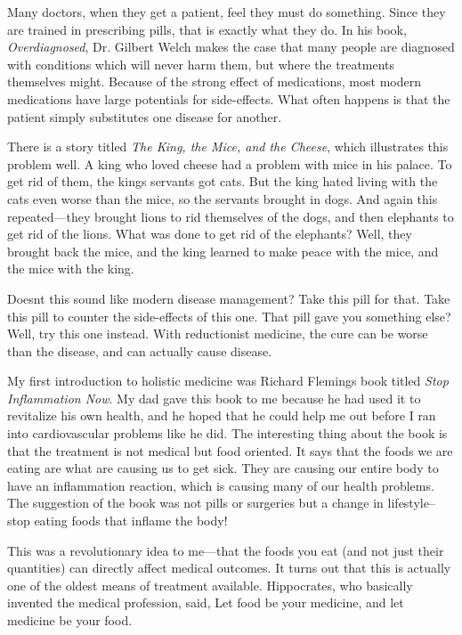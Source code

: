 Many doctors, when they get a patient, feel they must do something.
Since they are trained in prescribing pills, that is exactly what they
do.  In his book, \textit{Overdiagnosed}, Dr. Gilbert Welch makes the
case that many people are diagnosed with conditions which will never
harm them, but where the treatments themselves might.  Because of the
strong effect of medications, most modern medications have large
potentials for side-effects. What often happens is that the patient
simply substitutes one disease for another. 

There is a story titled \textit{The King, the Mice, and the Cheese},
which illustrates this problem well. A king who loved cheese had a
problem with mice in his palace. To get rid of them, the
king{\textquotesingle}s servants got cats. But the king hated living
with the cats even worse than the mice, so the servants brought in
dogs. And again this repeated—they brought lions to rid themselves of
the dogs, and then elephants to get rid of the lions. What was done to
get rid of the elephants?  Well, they brought back the mice, and the
king learned to make peace with the mice, and the mice with the king.

Doesn{\textquotesingle}t this sound like modern disease management? 
Take this pill for that. Take this pill to counter the side-effects of
this one. That pill gave you something else?  Well, try this one
instead. With reductionist medicine, the cure can be worse than the
disease, and can actually cause disease.

My first introduction to holistic medicine was Richard
Fleming{\textquotesingle}s book titled \textit{Stop Inflammation Now}.
My dad gave this book to me because he had used it to revitalize his
own health, and he hoped that he could help me out before I ran into
cardiovascular problems like he did. The interesting thing about the
book is that the treatment is not medical but food oriented. It says
that the foods we are eating are what are causing us to get sick. They
are causing our entire body to have an inflammation reaction, which is
causing many of our health problems. The suggestion of the book was not
pills or surgeries but a change in lifestyle–stop eating foods that
inflame the body!

This was a revolutionary idea to me—that the foods you eat (and not just
their quantities) can directly affect medical outcomes. It turns out
that this is actually one of the oldest means of treatment available.
Hippocrates, who basically invented the medical profession, said,
{\textquotedbl}Let food be your medicine, and let medicine be your
food.{\textquotedbl}  

